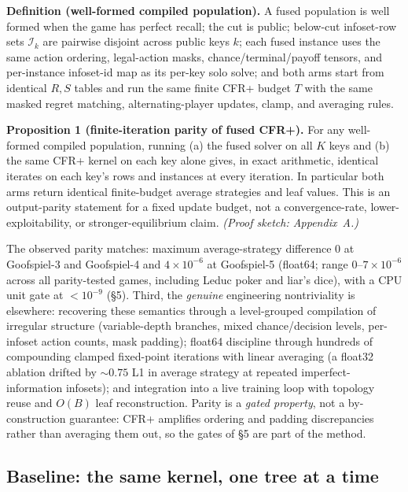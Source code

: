 \documentclass[11pt]{article}
\begin{document}
\begin{framed}\small
\noindent\textbf{Definition (well-formed compiled population).} A fused population is
well formed when the game has perfect recall; the cut is public; below-cut infoset-row
sets $\mathcal{I}_k$ are pairwise disjoint across public keys $k$; each fused instance
uses the same action ordering, legal-action masks, chance/terminal/payoff tensors, and
per-instance infoset-id map as its per-key solo solve; and both arms start from
identical $R,S$ tables and run the same finite CFR+ budget $T$ with the same masked
regret matching, alternating-player updates, clamp, and averaging rules.

\noindent\textbf{Proposition 1 (finite-iteration parity of fused CFR+).} For any
well-formed compiled population, running (a) the fused solver on all $K$ keys and (b)
the same CFR+ kernel on each key alone gives, in exact arithmetic, identical iterates on
each key's rows and instances at every iteration. In particular both arms return
identical finite-budget average strategies and leaf values. This is an output-parity
statement for a fixed update budget, not a convergence-rate, lower-exploitability, or
stronger-equilibrium claim. \emph{(Proof sketch: Appendix~A.)}
\end{framed}

The observed parity matches: maximum average-strategy difference $0$ at Goofspiel-3 and
Goofspiel-4 and $4\times10^{-6}$ at Goofspiel-5 (float64; range $0$--$7\times10^{-6}$
across all parity-tested games, including Leduc poker and liar's dice), with a CPU unit
gate at $<10^{-9}$ (\S5). Third, the \emph{genuine} engineering nontriviality is
elsewhere: recovering these semantics through a level-grouped compilation of irregular
structure (variable-depth branches, mixed chance/decision levels, per-infoset action
counts, mask padding); float64 discipline through hundreds of compounding clamped
fixed-point iterations with linear averaging (a float32 ablation drifted by $\sim 0.75$
L1 in average strategy at repeated imperfect-information infosets); and integration into
a live training loop with topology reuse and $O(B)$ leaf reconstruction. Parity is a
\emph{gated property}, not a by-construction guarantee: CFR+ amplifies ordering and
padding discrepancies rather than averaging them out, so the gates of \S5 are part of
the method.

\subsection{Baseline: the same kernel, one tree at a time}
\end{document}
